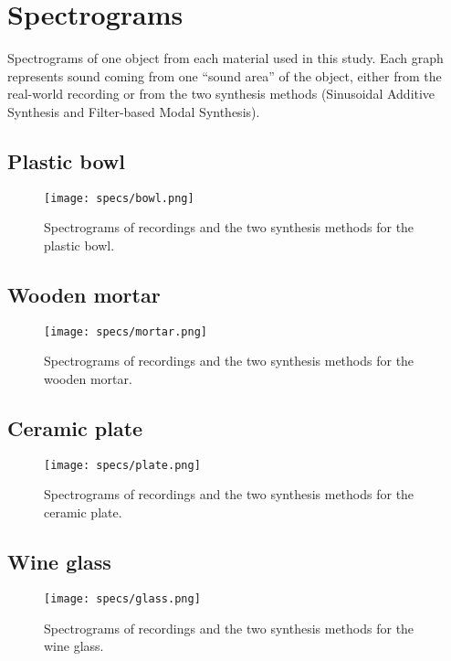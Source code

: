 \chapter{Spectrograms}\label{ap:spectrograms}
Spectrograms of one object from each material used in this study. Each graph represents sound coming from one ``sound area'' of the object, either from the real-world recording or from the two synthesis methods (Sinusoidal Additive Synthesis and Filter-based Modal Synthesis).
\section*{Plastic bowl}

\begin{figure}[H]
  \centering
    \texttt{[image: specs/bowl.png]}
      \caption{Spectrograms of recordings and the two synthesis methods for the plastic bowl.}
      \label{fig:sp_bowl}
\end{figure}

\newpage

\section*{Wooden mortar}

\begin{figure}[H]
  \centering
    \texttt{[image: specs/mortar.png]}
      \caption{Spectrograms of recordings and the two synthesis methods for the wooden mortar.}
      \label{fig:sp_mortar}
\end{figure}

\newpage

\section*{Ceramic plate}

\begin{figure}[H]
  \centering
    \texttt{[image: specs/plate.png]}
      \caption{Spectrograms of recordings and the two synthesis methods for the ceramic plate.}
      \label{fig:sp_plate}
\end{figure}

\newpage

\section*{Wine glass}

\begin{figure}[H]
  \centering
    \texttt{[image: specs/glass.png]}
      \caption{Spectrograms of recordings and the two synthesis methods for the wine glass.}
      \label{fig:sp_glass}
\end{figure}

